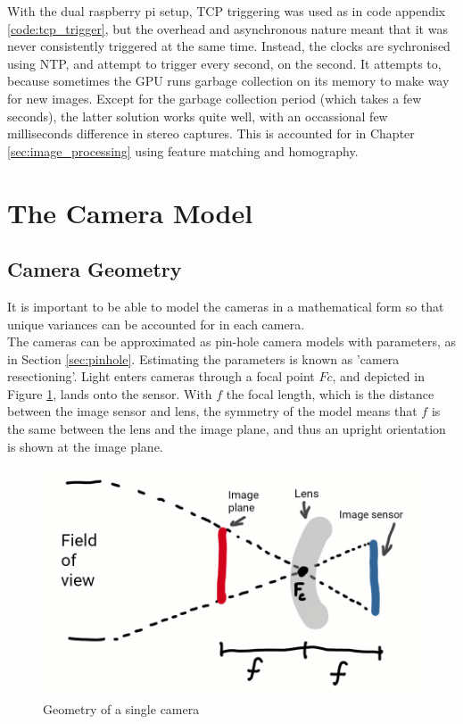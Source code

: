 With the dual raspberry pi setup, TCP triggering was used as in code appendix \ref{code:tcp_trigger}, but the overhead and asynchronous nature meant that it was never consistently triggered at the same time. Instead, the clocks are sychronised using NTP, and attempt to trigger every second, on the second. It attempts to, because sometimes the GPU runs garbage collection on its memory to make way for new images. Except for the garbage collection period (which takes a few seconds), the latter solution works quite well, with an occassional few milliseconds difference in stereo captures. This is accounted for in Chapter \ref{sec:image_processing} using feature matching and homography.

\section{The Camera Model}
\label{sec:cam_model}
\subsection{Camera Geometry}
\label{sec:cam_geometry}

It is important to be able to model the cameras in a mathematical form so that unique variances can be accounted for in each camera.\\

The cameras can be approximated as pin-hole camera models with parameters, as in Section \ref{sec:pinhole}. Estimating the parameters is known as 'camera resectioning'. Light enters cameras through a focal point $Fc$, and depicted in Figure \ref{fig:camera_geometry}, lands onto the sensor. With $f$ the focal length, which is the distance between the image sensor and lens, the symmetry of the model means that $f$ is the same between the lens and the image plane, and thus an upright orientation is shown at the image plane.

\begin{figure}[H]
\centering
\includegraphics[scale=0.35]{images/camera_geometry.png}
\caption{Geometry of a single camera}
\label{fig:camera_geometry}
\end{figure}

